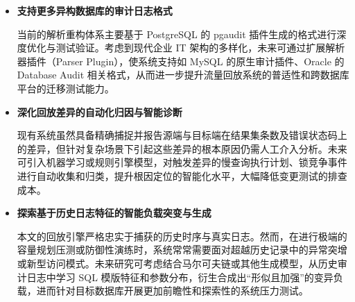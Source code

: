 \begin{itemize}
	\item[(1)]  \textbf{支持更多异构数据库的审计日志格式}
	
    当前的解析重构体系主要基于 PostgreSQL 的 pgaudit 插件生成的格式进行深度优化与测试验证。考虑到现代企业 IT 架构的多样化，未来可通过扩展解析器插件（Parser Plugin），使系统支持如 MySQL 的原生审计插件、Oracle 的 Database Audit 相关格式，从而进一步提升流量回放系统的普适性和跨数据库平台的迁移测试能力。
	
	\item[(2)] \textbf{深化回放差异的自动化归因与智能诊断}
	
    现有系统虽然具备精确捕捉并报告源端与目标端在结果集条数及错误状态码上的差异，但针对复杂场景下引起这些差异的根本原因仍需人工介入分析。未来可引入机器学习或规则引擎模型，对触发差异的慢查询执行计划、锁竞争事件进行自动收集和归类，提升根因定位的智能化水平，大幅降低变更测试的排查成本。
	
	\item[(3)] \textbf{探索基于历史日志特征的智能负载突变与生成}
	
    本文的回放引擎严格忠实于捕获的历史时序与真实日志。然而，在进行极端的容量规划压测或防御性演练时，系统常常需要面对超越历史记录中的异常突增或新型访问模式。未来研究可考虑结合马尔可夫链或其他生成模型，从历史审计日志中学习 SQL 模版特征和参数分布，衍生合成出“形似且加强”的变异负载，进而针对目标数据库开展更加前瞻性和探索性的系统压力测试。
	
\end{itemize}

